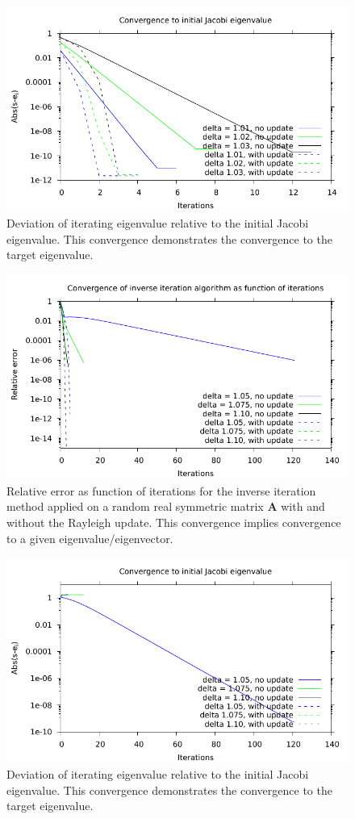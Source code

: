 \documentclass{article}
\begin{document}
	\begin{figure}
		\includegraphics[]{../Convergence2.pdf}
		\caption{Deviation of iterating eigenvalue relative to the initial Jacobi eigenvalue. This convergence demonstrates the convergence to the target eigenvalue.}
		\label{fig:convergence2}
	\end{figure}
	\begin{figure}
		\includegraphics[]{../Convergence3.pdf}
		\caption{Relative error as function of iterations for the inverse iteration method applied on a random real symmetric matrix $\mathbf{A}$ with and without the Rayleigh update. This convergence implies convergence to a given eigenvalue/eigenvector.}
		\label{fig:convergence3}
	\end{figure}
	\begin{figure}
		\includegraphics[]{../Convergence4.pdf}
		\caption{Deviation of iterating eigenvalue relative to the initial Jacobi eigenvalue. This convergence demonstrates the convergence to the target eigenvalue.}
		\label{fig:convergence4}
	\end{figure}
\end{document}
